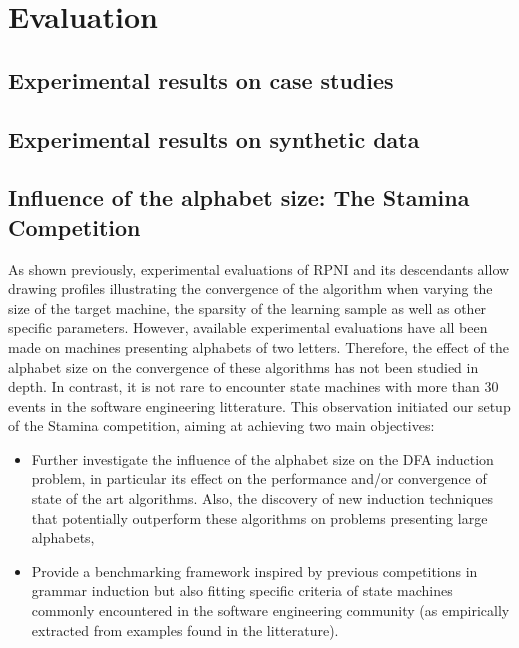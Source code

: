 \chapter{Evaluation}

\section{Experimental results on case studies}

\section{Experimental results on synthetic data}

\section{Influence of the alphabet size: The Stamina Competition\label{section_stamina}}

As shown previously, experimental evaluations of RPNI and its descendants allow drawing profiles illustrating the convergence of the algorithm when varying the size of the target machine, the sparsity of the learning sample as well as other specific parameters. However, available experimental evaluations \cite{Lang98,Damas06,Dupont08,Lambeau08} have all been made on machines presenting alphabets of two letters. Therefore, the effect of the alphabet size on the convergence of these algorithms has not been studied in depth. In contrast, it is not rare to encounter state machines with more than 30 events in the software engineering litterature. This observation initiated our setup of the Stamina competition, aiming at achieving two main objectives:

\begin{itemize}
\item Further investigate the influence of the alphabet size on the DFA induction problem, in particular its effect on the performance and/or convergence of state of the art algorithms. Also, the discovery of new induction techniques that potentially outperform these algorithms on problems presenting large alphabets,
\item Provide a benchmarking framework inspired by previous competitions in grammar induction but also fitting specific criteria of state machines commonly encountered in the software engineering community (as empirically extracted from examples found in the litterature).
\end{itemize}

